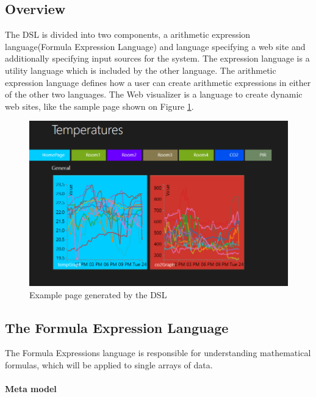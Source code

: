 \subsection{Overview}
The DSL is divided into two components, a arithmetic expression language(Formula Expression
Language) and language specifying a web site and additionally specifying input sources for
the system. 
The expression language is a utility language which is included by the other language. 
The arithmetic expression language defines how a user can create arithmetic expressions in
either of the other two languages. 
The Web visualizer is a language to create dynamic web sites, like the sample page shown on Figure \ref{fig:frontpage}.

\begin{figure}
  \begin{center}
    \includegraphics[width=\linewidth]{images/frontpage}
  \end{center}
  \caption{Example page generated by the DSL}
  \label{fig:frontpage}
\end{figure}

\subsection{The Formula Expression Language}
The Formula Expressions language is responsible for understanding mathematical formulas,
which will be applied to single arrays of data.
\paragraph{Meta model}

